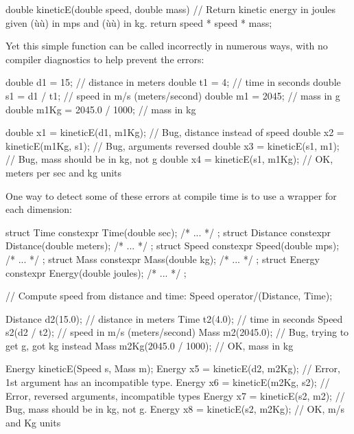 \begin{emcppslisting}[emcppsbatch=e20]
double kineticE(double speed, double mass)
    // Return kinetic energy in joules given (ù{}ù) in mps and (ù{}ù) in kg.
{
    return speed * speed * mass;
}
\end{emcppslisting}

\noindent Yet this simple function can be called incorrectly in numerous ways,
with no compiler diagnostics to help prevent the errors:

\begin{emcppslisting}[emcppsbatch=e20]
double d1   = 15;             // distance in meters
double t1   = 4;              // time in seconds
double s1   = d1 / t1;        // speed in m/s (meters/second)
double m1   = 2045;           // mass in g
double m1Kg = 2045.0 / 1000;  // mass in kg

double x1 = kineticE(d1, m1Kg);  // Bug, distance instead of speed
double x2 = kineticE(m1Kg, s1);  // Bug, arguments reversed
double x3 = kineticE(s1, m1);    // Bug, mass should be in kg, not g
double x4 = kineticE(s1, m1Kg);  // OK, meters per sec and kg units
\end{emcppslisting}

\noindent One way to detect some of these errors at compile time is to use a
wrapper for each dimension:

\begin{emcppslisting}[emcppsbatch=e20]
struct Time     { constexpr Time(double sec);        /* ... */ };
struct Distance { constexpr Distance(double meters); /* ... */ };
struct Speed    { constexpr Speed(double mps);       /* ... */ };
struct Mass     { constexpr Mass(double kg);         /* ... */ };
struct Energy   { constexpr Energy(double joules);   /* ... */ };

// Compute speed from distance and time:
Speed operator/(Distance, Time);

Distance d2(15.0);             // distance in meters
Time     t2(4.0);              // time in seconds
Speed    s2(d2 / t2);          // speed in m/s (meters/second)
Mass     m2(2045.0);           // Bug, trying to get g, got kg instead
Mass     m2Kg(2045.0 / 1000);  // OK, mass in kg

Energy kineticE(Speed s, Mass m);
Energy x5 = kineticE(d2, m2Kg); // Error, 1st argument has an incompatible type.
Energy x6 = kineticE(m2Kg, s2); // Error, reversed arguments, incompatible types
Energy x7 = kineticE(s2, m2);   // Bug, mass should be in kg, not g.
Energy x8 = kineticE(s2, m2Kg); // OK, m/s and Kg units
\end{emcppslisting}

